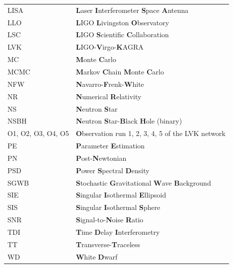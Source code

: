 \documentclass[oneside, 11pt]{book}
\begin{document}
\begin{center}
\begin{tabular}{R{5cm} L{10cm}}
LISA & \textbf{L}aser \textbf{I}nterferometer \textbf{S}pace \textbf{A}ntenna \\
LLO & \textbf{L}IGO \textbf{L}ivingston \textbf{O}bservatory \\
LSC & \textbf{L}IGO \textbf{S}cientific \textbf{C}ollaboration \\
LVK & \textbf{L}IGO-\textbf{V}irgo-\textbf{K}AGRA \\
MC & \textbf{M}onte \textbf{C}arlo \\
MCMC & \textbf{M}arkov \textbf{C}hain \textbf{M}onte \textbf{C}arlo \\
NFW & \textbf{N}avarro-\textbf{F}renk-\textbf{W}hite \\
NR & \textbf{N}umerical \textbf{R}elativity \\
NS & \textbf{N}eutron \textbf{S}tar \\
NSBH & \textbf{N}eutron \textbf{S}tar-\textbf{B}lack \textbf{H}ole (binary) \\
O1, O2, O3, O4, O5 & \textbf{O}bservation run 1, 2, 3, 4, 5 of the LVK network \\
PE & \textbf{P}arameter \textbf{E}stimation \\
PN & \textbf{P}ost-\textbf{N}ewtonian \\
PSD & \textbf{P}ower \textbf{S}pectral \textbf{D}ensity \\
SGWB & \textbf{S}tochastic \textbf{G}ravitational \textbf{W}ave \textbf{B}ackground \\
SIE & \textbf{S}ingular \textbf{I}sothermal \textbf{E}llipsoid \\
SIS & \textbf{S}ingular \textbf{I}sothermal \textbf{S}phere \\
SNR & \textbf{S}ignal-to-\textbf{N}oise \textbf{R}atio \\
TDI & \textbf{T}ime \textbf{D}elay \textbf{I}nterferometry \\
TT & \textbf{T}ransverse-\textbf{T}raceless \\
WD & \textbf{W}hite \textbf{D}warf \\



\end{tabular}
\end{center}



\newpage

\mainmatter %
\end{document}

